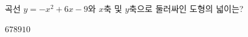 곡선 $y=-x^2+6x-9$와 $x$축 및 $y$축으로 둘러싸인 도형의 넓이는?
\begin{choices32}{$6$}{$7$}{$8$}{$9$}{$10$}\end{choices32}
